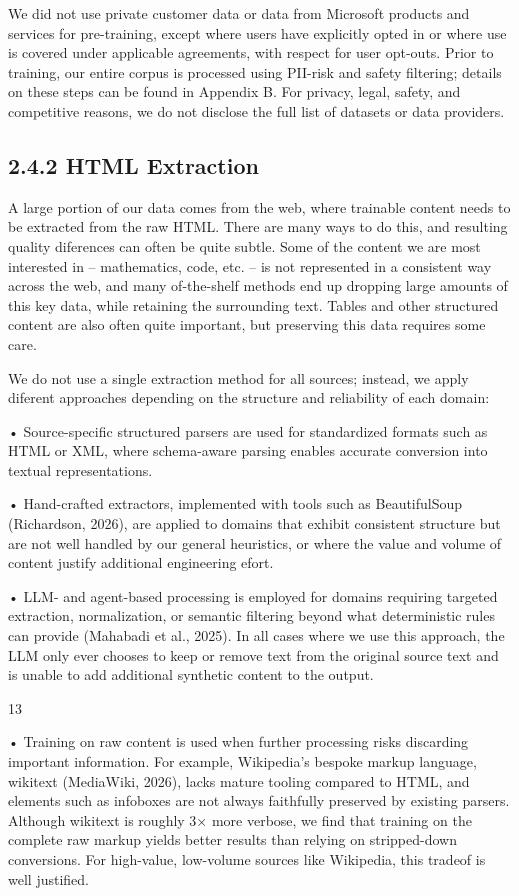 \documentclass[
  10
]{article}
\begin{document}
We did not use private customer data or data from Microsoft products and
services for pre-training, except where users have explicitly opted in
or where use is covered under applicable agreements, with respect for
user opt-outs. Prior to training, our entire corpus is processed using
PII-risk and safety filtering; details on these steps can be found in
Appendix B. For privacy, legal, safety, and competitive reasons, we do
not disclose the full list of datasets or data providers.

\subsection{2.4.2 HTML Extraction}\label{html-extraction}

A large portion of our data comes from the web, where trainable content
needs to be extracted from the raw HTML. There are many ways to do this,
and resulting quality diferences can often be quite subtle. Some of the
content we are most interested in -- mathematics, code, etc. -- is not
represented in a consistent way across the web, and many of-the-shelf
methods end up dropping large amounts of this key data, while retaining
the surrounding text. Tables and other structured content are also often
quite important, but preserving this data requires some care.

We do not use a single extraction method for all sources; instead, we
apply diferent approaches depending on the structure and reliability of
each domain:

• Source-specific structured parsers are used for standardized formats
such as HTML or XML, where schema-aware parsing enables accurate
conversion into textual representations.

• Hand-crafted extractors, implemented with tools such as BeautifulSoup
(Richardson, 2026), are applied to domains that exhibit consistent
structure but are not well handled by our general heuristics, or where
the value and volume of content justify additional engineering efort.

• LLM- and agent-based processing is employed for domains requiring
targeted extraction, normalization, or semantic filtering beyond what
deterministic rules can provide (Mahabadi et al., 2025). In all cases
where we use this approach, the LLM only ever chooses to keep or remove
text from the original source text and is unable to add additional
synthetic content to the output.

13

• Training on raw content is used when further processing risks
discarding important information. For example, Wikipedia's bespoke
markup language, wikitext (MediaWiki, 2026), lacks mature tooling
compared to HTML, and elements such as infoboxes are not always
faithfully preserved by existing parsers. Although wikitext is roughly
3× more verbose, we find that training on the complete raw markup yields
better results than relying on stripped-down conversions. For
high-value, low-volume sources like Wikipedia, this tradeof is well
justified.
\end{document}
